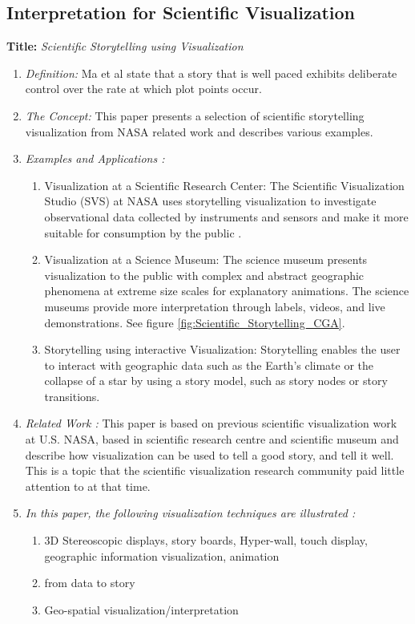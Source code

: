 \documentclass{egpubl}
\begin{document}
\subsection{Interpretation for Scientific Visualization}
\textbf{Title:} \textit{Scientific Storytelling using Visualization}
\begin{enumerate}
\item \textit{Definition:} Ma et al \cite{sci} state that a story that is well paced exhibits deliberate control over the rate at which plot points occur.
\item \textit{The Concept:} This paper presents a selection of scientific storytelling visualization from NASA related work and describes various examples.
\item  \textit{Examples and Applications :} 
\begin{enumerate}
\item Visualization at a Scientific Research Center: The Scientific Visualization Studio (SVS) at NASA uses storytelling visualization to investigate observational data collected by instruments and sensors and make it more suitable for consumption by the public \cite{nasa}\cite{svs1}.
\item Visualization at a Science Museum: The science museum presents visualization to the public with complex and abstract geographic phenomena at extreme size scales for explanatory animations. The science museums provide more interpretation through labels, videos, and live demonstrations. See figure \ref{fig:Scientific_Storytelling_CGA}\cite{sci}.
\item Storytelling using interactive Visualization: Storytelling enables the user to interact with geographic data such as the Earth's climate or the collapse of a star by using a story model, such as story nodes or story transitions\cite{Akiba}.
\end{enumerate}
\item \textit{Related Work :} This paper is based on previous scientific visualization work at U.S. NASA, based in scientific research centre and scientific museum and describe how  visualization can be used to tell a good story, and tell it well. This is a topic that the scientific visualization research community paid little attention to at that time.
\item \textit{In this paper, the following visualization techniques are illustrated :} 
\begin{enumerate}
\item 3D Stereoscopic displays, story boards, Hyper-wall, touch display, geographic information visualization, animation
\item from data to story
\item Geo-spatial visualization/interpretation
\end{enumerate}
\end{enumerate}
\end{document}
